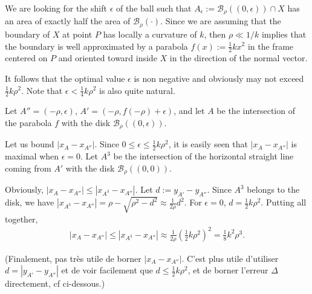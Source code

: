 \documentclass{paper}
\begin{document}
We are looking for the shift $\epsilon$ of the ball such that
$A_\epsilon := \mathcal{B}_\rho( (0,\epsilon) ) \cap X$ has an area of exactly
half the area of $\mathcal{B}_\rho(\cdot)$. Since we are assuming that the
boundary of $X$ at point $P$ has locally a curvature of $k$, then
$\rho \ll 1/k$ implies that the boundary is well approximated by a
parabola $f(x):=\frac{1}{2}kx^2$ in the frame centered on $P$ and oriented
toward inside $X$ in the direction of the normal vector.

It follows that the optimal value $\epsilon$ is non negative and
obviously may not exceed $\frac{1}{2}k\rho^2$. Note that $\epsilon <
\frac{1}{4}k\rho^2$ is also quite natural.

Let $A''=(-\rho,\epsilon)$, $A'=(-\rho,f(-\rho)+\epsilon)$, and let
$A$ be the intersection of the parabola $f$ with the disk
$\mathcal{B}_\rho( (0,\epsilon) )$.

Let us bound $|x_A -x_{A''}|$. Since $0 \le \epsilon \le
\frac{1}{2}k\rho^2$, it is easily seen that $|x_A -x_{A''}|$ is
maximal when $\epsilon=0$.
Let $A^3$ be the intersection of the horizontal straight line coming from $A'$ with the disk $\mathcal{B}_\rho((0,0))$.

Obviously, $|x_A -x_{A''}| \le |x_{A^3} -x_{A''}|$. 
Let $d:=y_{A'}-y_{A''}$. Since $A^3$ belongs to the disk, we have
$|x_{A^3} -x_{A''}| = \rho-\sqrt{\rho^2 - d^2} \approx \frac{1}{2\rho}{d^2}$.
For $\epsilon=0$, $d=\frac{1}{2}k\rho^2$.
Putting all together,
\begin{align*}
  |x_A -x_{A''}| \le |x_{A^3} -x_{A''}| 
  \approx \frac{1}{2\rho}{\left(\frac{1}{2}k\rho^2\right)^2}
  = \frac{1}{8}k^2 \rho^3.
\end{align*}

{\color{blue} (Finalement, pas très utile de borner $|x_A -x_{A''}|$. C'est plus utile d'utiliser $d=|y_{A'}-y_{A''}|$ et de voir facilement que $d\le\frac{1}{2}k\rho^2$, et de borner l'erreur $\Delta$ directement, cf ci-dessous.)}
\end{document}
